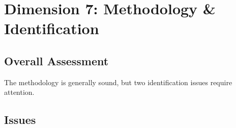 \documentclass[12pt,a4paper]{article}
\begin{document}
\section{Dimension 7: Methodology \& Identification}

\subsection*{Overall Assessment}
The methodology is generally sound, but two identification issues require attention.

\subsection*{Issues}
\end{document}
